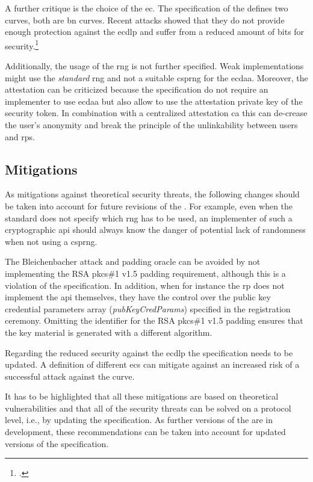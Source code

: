 A further critique is the choice of the \gls{ec}. The specification of the \wa{} defines two curves, both are \gls{bn} curves. Recent attacks showed that they do not provide enough protection against the \gls{ecdlp} and suffer from a reduced amount of bits for security.\footcites[See][562]{10.1007/978-3-662-53018-4_20}

Additionally, the usage of the \gls{rng} is not further specified. Weak implementations might use the \textit{standard} \gls{rng} and not a suitable \gls{csprng} for the \gls{ecdaa}. Moreover, the attestation can be criticized because the specification do not require an implementer to use \gls{ecdaa} but also allow to use the attestation private key of the security token. In combination with a centralized attestation \gls{ca} this can de-crease the user's anonymity and break the principle of the unlinkability between users and \glspl{rp}.

\subsection{Mitigations}

As mitigations against theoretical security threats, the following changes should be taken into account for future revisions of the \wa{}. For example, even when the standard does not specify which \gls{rng} has to be used, an implementer of such a cryptographic \gls{api} should always know the danger of potential lack of randomness when not using a \gls{csprng}. 

The Bleichenbacher attack and padding oracle can be avoided by not implementing the RSA \gls{pkcs}\#1 v1.5 padding requirement, although this is a violation of the specification. In addition, when for instance the \gls{rp} does not implement the \gls{api} themselves, they have the control over the public key credential parameters array (\textit{pubKeyCredParams}) specified in the registration ceremony. Omitting the identifier for the RSA \gls{pkcs}\#1 v1.5 padding ensures that the key material is generated with a different algorithm.

Regarding the reduced security against the \gls{ecdlp} the specification needs to be updated. A definition of different \glspl{ec} can mitigate against an increased risk of a successful attack against the curve.

It has to be highlighted that all these mitigations are based on theoretical vulnerabilities and that all of the security threats can be solved on a protocol level, i.e., by updating the specification. As further versions of the \wa{} are in development, these recommendations can be taken into account for updated versions of the specification.
